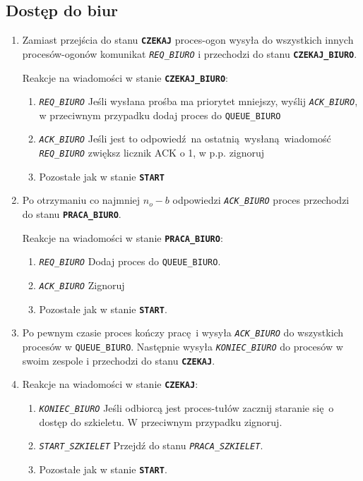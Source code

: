\documentclass[12pt]{article}
\newcommand{\state}[1]{\texttt{\textbf{#1}}}
\newcommand{\msg}[1]{\texttt{\emph{#1}}}
\newcommand{\var}[1]{\texttt{#1}}
\begin{document}
\subsection{Dostęp do biur}
\begin{enumerate}
	\item Zamiast przejścia do stanu \state{CZEKAJ} proces-ogon wysyła do wszystkich innych procesów-ogonów komunikat \msg{REQ\_BIURO} i przechodzi do stanu \state{CZEKAJ\_BIURO}.
	
	Reakcje na wiadomości w stanie \state{CZEKAJ\_BIURO}:
	\begin{enumerate}
		\item \msg{REQ\_BIURO} Jeśli wysłana prośba ma priorytet mniejszy, wyślij \msg{ACK\_BIURO}, w przeciwnym przypadku dodaj proces do \var{QUEUE\_BIURO}
		\item \msg{ACK\_BIURO} Jeśli jest to odpowiedź na ostatnią wysłaną wiadomość \msg{REQ\_BIURO} zwiększ licznik ACK o 1, w p.p. zignoruj
		\item  Pozostałe jak w stanie \state{START}
	\end{enumerate}
	
	\item Po otrzymaniu co najmniej $n_o - b$ odpowiedzi \msg{ACK\_BIURO} proces przechodzi do stanu \state{PRACA\_BIURO}.
	
	Reakcje na wiadomości w stanie \state{PRACA\_BIURO}:
	\begin{enumerate}
		\item \msg{REQ\_BIURO} Dodaj proces do \var{QUEUE\_BIURO}.
		\item \msg{ACK\_BIURO} Zignoruj
		\item  Pozostałe jak w stanie \state{START}.
	\end{enumerate}
	
	\item Po pewnym czasie proces kończy pracę i wysyła \msg{ACK\_BIURO} do wszystkich procesów w \var{QUEUE\_BIURO}. Następnie wysyła \msg{KONIEC\_BIURO} do procesów w swoim zespole i przechodzi do stanu \state{CZEKAJ}.
	
	\item Reakcje na wiadomości w stanie \state{CZEKAJ}:
	\begin{enumerate}
		\item \msg{KONIEC\_BIURO} Jeśli odbiorcą jest proces-tułów zacznij staranie się o dostęp do szkieletu. W przeciwnym przypadku zignoruj.
		\item \msg{START\_SZKIELET} Przejdź do stanu \msg{PRACA\_SZKIELET}.
		\item Pozostałe jak w stanie \state{START}.
	\end{enumerate}
\end{enumerate}
\end{document}
